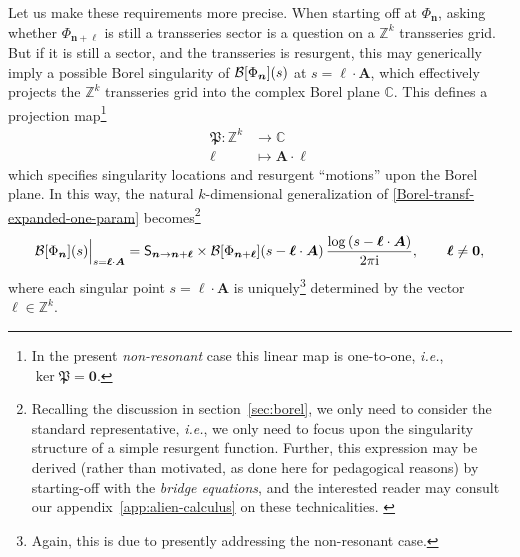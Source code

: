 \documentclass[11pt,a4paper]{article}
\newcommand{\CB}{{\cal B}}
\def\BZ{{\mathbb Z}}
\def\BC{{\mathbb C}}
\newcommand{\rmi}{{\mathrm{i}}}
\begin{document}
Let us make these requirements more precise. When starting off at $\Phi_{\boldsymbol{n}}$, asking whether $\Phi_{\boldsymbol{n}+\boldsymbol{\ell}}$ is still a transseries sector is a question on a $\BZ^k$ transseries grid. But if it is still a sector, and the transseries is resurgent, this may generically imply a possible Borel singularity of $\CB [\Phi_{\boldsymbol{n}}] (s)$ at $s = \boldsymbol{\ell} \cdot \boldsymbol{A}$, which effectively projects the $\BZ^k$ transseries grid into the complex Borel plane $\BC$. This defines a projection map\footnote{In the present \textit{non-resonant} case this linear map is one-to-one, \textit{i.e.}, $\ker \mathfrak{P} = \boldsymbol{0}$.}
%
\begin{align}
\mathfrak{P} : \BZ^k & \to \BC \nonumber \\
\boldsymbol{\ell} & \mapsto \boldsymbol{A} \cdot \boldsymbol{\ell}  
\label{projectionmapZkC}
\end{align}
%
\noindent
which specifies singularity locations and resurgent ``motions'' upon the Borel plane. In this way, the natural $k$-dimensional generalization of \eqref{Borel-transf-expanded-one-param} becomes\footnote{Recalling the discussion in section~\ref{sec:borel}, we only need to consider the standard representative, \textit{i.e.}, we only need to focus upon the singularity structure of a simple resurgent function. Further, this expression may be derived (rather than motivated, as done here for pedagogical reasons) by starting-off with the \textit{bridge equations}, and the interested reader may consult our appendix~\ref{app:alien-calculus} on these technicalities.
\label{footnoteBEink-transeries}}
%
\begin{equation}
\label{eq:sec5-Borel-transf}
\CB [\Phi_{\boldsymbol{n}}] (s) \Big|_{s=\boldsymbol{\ell}\cdot\boldsymbol{A}} = \mathsf{S}_{\boldsymbol{n} \to \boldsymbol{n}+\boldsymbol{\ell}} \times \CB [\Phi_{\boldsymbol{n}+\boldsymbol{\ell}}] (s-\boldsymbol{\ell}\cdot\boldsymbol{A})\, \frac{\log \left(s-\boldsymbol{\ell}\cdot\boldsymbol{A}\right)}{2\pi\rmi}, \qquad \boldsymbol{\ell} \neq \boldsymbol{0},
\end{equation}
%
\noindent
where each singular point $s=\boldsymbol{\ell}\cdot\boldsymbol{A}$ is uniquely\footnote{Again, this is due to presently addressing the non-resonant case.} determined by the vector $\boldsymbol{\ell} \in \BZ^k$.
\end{document}
